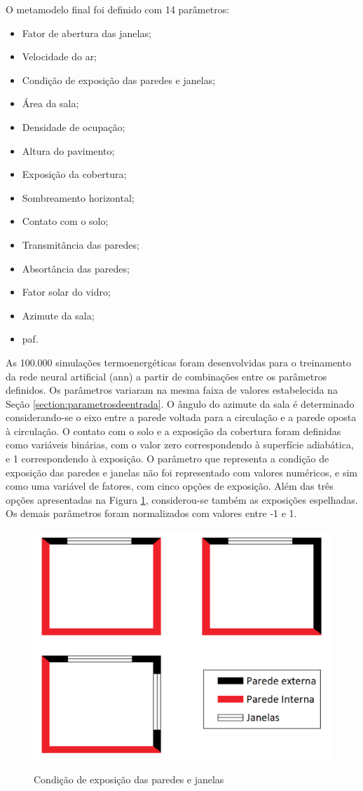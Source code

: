 \documentclass[brazil,hardcopy,openany]{ufscthesis} %
\begin{document}
O metamodelo final foi definido com 14 parâmetros:
\begin{itemize}
	\item Fator de abertura das janelas;
	\item Velocidade do ar;
	\item Condição de exposição das paredes e janelas;
	\item Área da sala;
	\item Densidade de ocupação;
	\item Altura do pavimento;
	\item Exposição da cobertura;
	\item Sombreamento horizontal;
	\item Contato com o solo;
	\item Transmitância das paredes;
	\item Absortância das paredes;
	\item Fator solar do vidro;
	\item Azimute da sala;
	\item \Acrlong{paf}.
\end{itemize}

As 100.000 simulações termoenergéticas foram desenvolvidas para o treinamento da rede neural artificial (\acrshort{ann}) a partir de combinações entre os parâmetros definidos.
Os parâmetros variaram na mesma faixa de valores estabelecida na Seção \ref{section:parametrosdeentrada}. O ângulo do azimute da sala é determinado considerando-se o eixo entre a parede voltada para a circulação e a parede oposta à circulação.
O contato com o solo e a exposição da cobertura foram definidas como variáveis binárias, com o valor zero correspondendo à superfície adiabática, e 1 correspondendo à exposição.
O parâmetro que representa a condição de exposição das paredes e janelas não foi representado com valores numéricos, e sim como uma variável de fatores, com cinco opções de exposição. Além das três opções apresentadas na Figura \ref{fig:exp_sz}, considerou-se também as exposições espelhadas. 	
Os demais parâmetros foram normalizados com valores entre -1 e 1.

\begin{figure}[h]
	\centering
	\caption{Condição de exposição das paredes e janelas}
	\includegraphics[width=.5\linewidth]{img/wallexposition2.png}
	\label{fig:exp_sz}
\end{figure}
\end{document}
